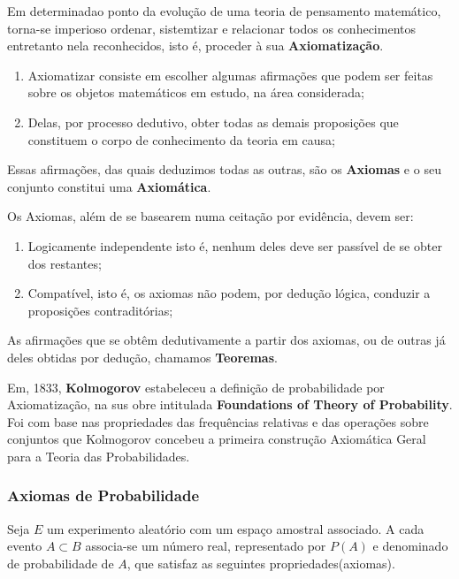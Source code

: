\inic Em determinadao ponto da evolução de uma teoria de pensamento matemático, torna-se imperioso ordenar, sistemtizar e relacionar todos os conhecimentos entretanto nela reconhecidos, isto é, proceder à sua \textbf{Axiomatização}. 
 
\begin{enumerate}
\item Axiomatizar consiste em escolher algumas afirmações que podem ser feitas sobre os objetos matemáticos em estudo, na área considerada;
\item Delas, por processo dedutivo, obter todas as demais proposições que constituem o corpo de conhecimento da teoria em causa;
\end{enumerate} 

\inic Essas afirmações, das quais deduzimos todas as outras, são os \textbf{Axiomas} e o seu conjunto constitui uma \textbf{Axiomática}.\vskip0.3cm
 

\inic Os Axiomas, além de se basearem numa ceitação por evidência, devem ser:

\begin{enumerate}
    \item Logicamente independente isto é, nenhum deles deve ser passível de se obter dos restantes;
    \item Compatível, isto é, os axiomas não podem, por dedução lógica, conduzir a proposições contraditórias; 
\end{enumerate}
 
 \inic As afirmações que se obtêm dedutivamente a partir dos axiomas, ou de outras já deles obtidas por dedução, chamamos \textbf{Teoremas}.\vskip0.3cm
 
 \inic Em, 1833, \textbf{Kolmogorov} estabeleceu a definição de probabilidade por Axiomatização, na sus obre intitulada \textbf{Foundations of Theory of Probability}. Foi com base nas propriedades das frequências relativas e das operações sobre conjuntos que Kolmogorov concebeu a primeira construção Axiomática Geral para a Teoria das Probabilidades.\vskip0.3cm
 
\subsubsection{Axiomas de Probabilidade}

\inic Seja $E$ um experimento aleatório com um espaço amostral associado. A cada evento $A \subset B$ associa-se um número real, representado por $P(A)$ e denominado de probabilidade de $A$, que satisfaz as seguintes propriedades(axiomas).

